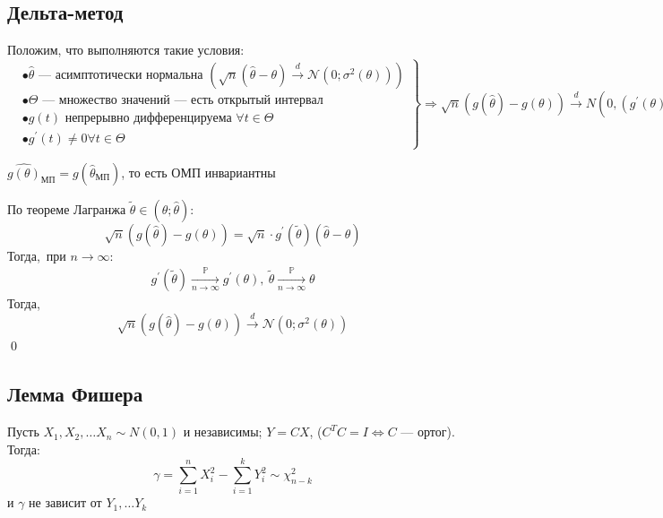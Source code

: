 \documentclass[a4paper, 10pt]{article}
\begin{document}
\subsection{Дельта-метод}
\theorem Положим, что выполняются такие условия:
\begin{equation*}
    \left.\begin{aligned}
        &\bullet\widehat{\theta}\text{ — асимптотически нормальна }(\sqrt{n}(\widehat{\theta}-\theta) \overset{d}{\longrightarrow} \mathcal{N}\left(0; \sigma^{2}(\theta)\right))\\
        &\bullet\Theta\text{ — множество значений — есть открытый интервал}\\
        &\bullet g(t)\text{ непрерывно дифференцируема }\forall t \in \Theta\\
        &\bullet g^{\prime}(t) \neq 0 \forall t \in \Theta
    \end{aligned}\right\}\Longrightarrow\sqrt{n}(g(\hat{\theta})-g(\theta)) \overset{d}{\longrightarrow} N\left(0,\left(g^{\prime}(\theta)\right)^{2} \sigma^{2}(\theta)\right)
\end{equation*}

\comment $\widehat{g(\theta)}_{\text{МП}}=g(\widehat{\theta}_{\text{МП}})$, то есть ОМП инвариантны

\proof По теореме Лагранжа $\widetilde{\theta}\in(\theta;\widehat{\theta})$:
\begin{equation*}
    \sqrt{n}(g(\hat{\theta})-g(\theta))=\sqrt{n}\cdot g^{\prime}(\widetilde{\theta})(\widehat{\theta}-\theta)
\end{equation*}
Тогда, при $n\to\infty$:
\begin{equation*}
    \begin{aligned}
        g^{\prime}(\widetilde{\theta})\underset{n\to\infty}{\overset{\mathbb{P}}{\longrightarrow}} g^{\prime}(\theta),\ \widetilde{\theta}\underset{n\to\infty}{\overset{\mathbb{P}}{\longrightarrow}}\theta
    \end{aligned}
\end{equation*}
Тогда,
\begin{equation*}
    \sqrt{n}(g(\hat{\theta})-g(\theta))\overset{d}{\longrightarrow}\mathcal{N}(0;\sigma^2(\theta))
\end{equation*}\qed 

\subsection{Лемма Фишера}
\theorem Пусть $X_{1}, X_{2}, \ldots X_{n} \sim N(0,1)$ и независимы; $Y=C X$, ($C^{T}C=I\Longleftrightarrow C$ — ортог). Тогда:
\begin{equation*}
    \gamma=\sum_{i=1}^{n} X_{i}^{2}-\sum_{i=1}^{k} Y_{i}^{2} \sim \chi^{2}_{n-k}
\end{equation*}
и $\gamma$ не зависит от $Y_{1}, \ldots Y_{k} $
\end{document}
